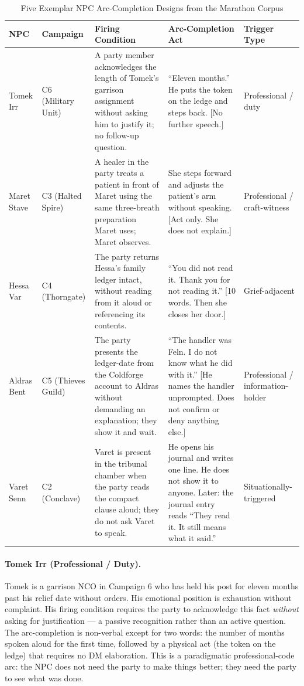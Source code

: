 \begin{table}[t]
\caption{Five Exemplar NPC Arc-Completion Designs from the Marathon Corpus}
\label{tab:exemplars}
\renewcommand{\arraystretch}{1.3}
\begin{tabular}{@{}p{1.8cm}p{1.4cm}p{4.2cm}p{4.4cm}p{2.5cm}@{}}
\toprule
\textbf{NPC} & \textbf{Campaign} & \textbf{Firing Condition} & \textbf{Arc-Completion Act} & \textbf{Trigger Type} \\
\midrule
Tomek Irr
  & C6 (Military Unit)
  & A party member acknowledges the length of Tomek's garrison assignment
    without asking him to justify it; no follow-up question.
  & ``Eleven months.'' He puts the token on the ledge and steps back.
    [No further speech.]
  & Professional / duty \\
\addlinespace
Maret Stave
  & C3 (Halted Spire)
  & A healer in the party treats a patient in front of Maret using the
    same three-breath preparation Maret uses; Maret observes.
  & She steps forward and adjusts the patient's arm without speaking.
    [Act only. She does not explain.]
  & Professional / craft-witness \\
\addlinespace
Hessa Var
  & C4 (Thorngate)
  & The party returns Hessa's family ledger intact, without reading from it
    aloud or referencing its contents.
  & ``You did not read it. Thank you for not reading it.''
    [10 words. Then she closes her door.]
  & Grief-adjacent \\
\addlinespace
Aldras Bent
  & C5 (Thieves Guild)
  & The party presents the ledger-date from the Coldforge account to Aldras
    without demanding an explanation; they show it and wait.
  & ``The handler was Feln. I do not know what he did with it.''
    [He names the handler unprompted. Does not confirm or deny anything else.]
  & Professional / information-holder \\
\addlinespace
Varet Senn
  & C2 (Conclave)
  & Varet is present in the tribunal chamber when the party reads the
    compact clause aloud; they do not ask Varet to speak.
  & He opens his journal and writes one line. He does not show it to anyone.
    Later: the journal entry reads ``They read it. It still means what it said.''
  & Situationally-triggered \\
\bottomrule
\end{tabular}
\end{table}

\paragraph{Tomek Irr (Professional / Duty).}
Tomek is a garrison NCO in Campaign 6 who has held his post for eleven months
past his relief date without orders. His emotional position is exhaustion
without complaint. His firing condition requires the party to acknowledge
this fact \textit{without} asking for justification --- a passive recognition
rather than an active question. The arc-completion is non-verbal except for
two words: the number of months spoken aloud for the first time, followed
by a physical act (the token on the ledge) that requires no DM elaboration.
This is a paradigmatic professional-code arc: the NPC does not need the party
to make things better; they need the party to see what was done.

